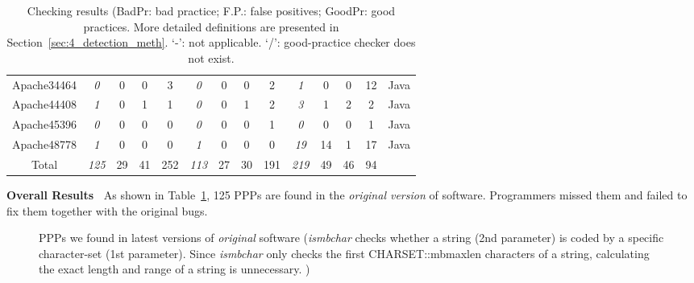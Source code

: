 \begin{table}[tb!]
\begin{adjustwidth}{-.75in}{-.75in}
{\begin{tabular}{cccccccccccccc}
Apache34464    & {\it  0}     & 0      & 0      & 3      & {\it 0 }     & 0      & 0      & 2      & {\it 1  }    & 0      & 0      & 12     & Java	\\
Apache44408    & {\it  1}     & 0      & 1      & 1      & {\it 0 }     & 0      & 1      & 2      & {\it 3  }    & 1      & 2      & 2      & Java	\\
Apache45396    & {\it  0}     & 0      & 0      & 0      & {\it 0 }     & 0      & 0      & 1      & {\it 0  }    & 0      & 0      & 1      & Java	\\
Apache48778    & {\it  1}     & 0      & 0      & 0      & {\it 1 }     & 0      & 0      & 0      & {\it 19 }    & 14     & 1      & 17     & Java	\\
\midrule                                                                                                                              
Total          & {\it 125}    & 29     & 41     & 252    & {\it 113}    & 27     & 30     & 191    & {\it 219}    & 49     & 46     & 94     &    	\\
\bottomrule
\end{tabular}
}
\end{adjustwidth}
\caption{Checking results (BadPr: bad practice; F.P.: false positives; GoodPr: good practices. More detailed definitions are presented in
Section~\ref{sec:4_detection_meth}. `-': not applicable. `/': good-practice checker does not exist.}
\label{tab:4_detect_result}
\end{table}

{\bf Overall Results\ }
As shown in Table~\ref{tab:4_detect_result}, 125 PPPs are found in the {\it original 
version} of software.
Programmers missed them and failed to fix them together with the original bugs.



\begin{figure}
  \centering
  \hfill
  \framebox{}
  \hfill
  \framebox{}
  \hspace*{\fill}
  \caption{PPPs we found in latest versions of {\it original} software (\textit{ismbchar} checks whether a string (2nd parameter) 
   is coded by a specific character-set (1st parameter). 
   Since \textit{ismbchar} only checks the first CHARSET::mbmaxlen characters of a string, 
   calculating the exact length and range of a string is unnecessary. )}
  \label{fig:MySQL15811&New}
\end{figure}


